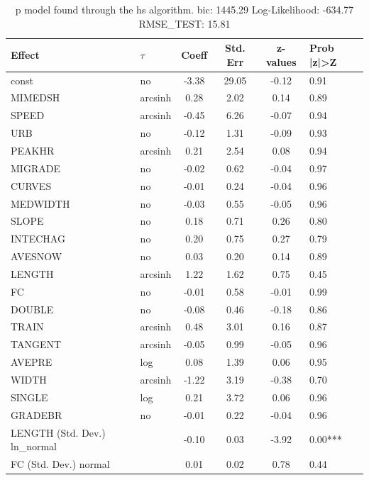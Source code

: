 \begin{table}
	\caption{p model found through the hs algorithm. bic: 1445.29 Log-Likelihood: -634.77 RMSE_TEST: 15.81}
	\begin{center}
		\begin{tabular}{|l|l|c|c|c|l|}
			\hline
			Effect & $\tau$ & Coeff & Std. Err & z-values & Prob |z|>Z \\
			\hline
			const & no & -3.38 & 29.05 & -0.12 & 0.91 \\
			\hline
			MIMEDSH & arcsinh & 0.28 & 2.02 & 0.14 & 0.89 \\
			\hline
			SPEED & arcsinh & -0.45 & 6.26 & -0.07 & 0.94 \\
			\hline
			URB & no & -0.12 & 1.31 & -0.09 & 0.93 \\
			\hline
			PEAKHR & arcsinh & 0.21 & 2.54 & 0.08 & 0.94 \\
			\hline
			MIGRADE & no & -0.02 & 0.62 & -0.04 & 0.97 \\
			\hline
			CURVES & no & -0.01 & 0.24 & -0.04 & 0.96 \\
			\hline
			MEDWIDTH & no & -0.03 & 0.55 & -0.05 & 0.96 \\
			\hline
			SLOPE & no & 0.18 & 0.71 & 0.26 & 0.80 \\
			\hline
			INTECHAG & no & 0.20 & 0.75 & 0.27 & 0.79 \\
			\hline
			AVESNOW & no & 0.03 & 0.20 & 0.14 & 0.89 \\
			\hline
			LENGTH & arcsinh & 1.22 & 1.62 & 0.75 & 0.45 \\
			\hline
			FC & no & -0.01 & 0.58 & -0.01 & 0.99 \\
			\hline
			DOUBLE & no & -0.08 & 0.46 & -0.18 & 0.86 \\
			\hline
			TRAIN & arcsinh & 0.48 & 3.01 & 0.16 & 0.87 \\
			\hline
			TANGENT & arcsinh & -0.05 & 0.99 & -0.05 & 0.96 \\
			\hline
			AVEPRE & log & 0.08 & 1.39 & 0.06 & 0.95 \\
			\hline
			WIDTH & arcsinh & -1.22 & 3.19 & -0.38 & 0.70 \\
			\hline
			SINGLE & log & 0.21 & 3.72 & 0.06 & 0.96 \\
			\hline
			GRADEBR & no & -0.01 & 0.22 & -0.04 & 0.96 \\
			\hline
			LENGTH (Std. Dev.) ln_normal &  & -0.10 & 0.03 & -3.92 & 0.00*** \\
			\hline
			FC (Std. Dev.) normal &  & 0.01 & 0.02 & 0.78 & 0.44 \\

\end{tabular}
\end{center}
\end{table}
